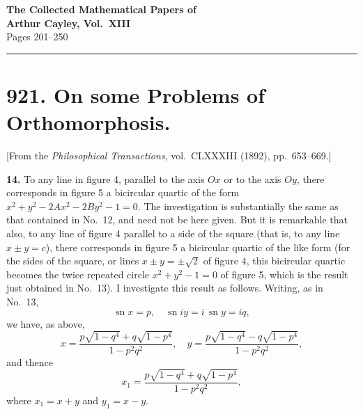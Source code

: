 \documentclass[12pt,a4paper]{article}
\begin{document}
\begin{center}
{\Large\bfseries The Collected Mathematical Papers of\\[4pt]
Arthur Cayley, Vol.~XIII}\\[12pt]
{\large Pages 201--250}\\[8pt]
\rule{\textwidth}{0.4pt}
\end{center}

\tableofcontents
\newpage



\section*{921. On some Problems of Orthomorphosis.}

[From the \textit{Philosophical Transactions}, vol.~CLXXXIII (1892), pp.~653--669.]

\bigskip

\textbf{14.} To any line in figure 4, parallel to the axis $Ox$ or to the axis $Oy$, there
corresponds in figure 5 a bicircular quartic of the form $x^2 + y^2 - 2Ax^2 - 2By^2 - 1 = 0$.
The investigation is substantially the same as that contained in No.~12, and need
not be here given. But it is remarkable that also, to any line of figure 4 parallel
to a side of the square (that is, to any line $x \pm y = c$), there corresponds in figure 5
a bicircular quartic of the like form (for the sides of the square, or lines $x \pm y = \pm \sqrt{2}$
of figure 4, this bicircular quartic becomes the twice repeated circle $x^2 + y^2 - 1 = 0$
of figure 5, which is the result just obtained in No.~13). I investigate this result
as follows. Writing, as in No.~13,
\[
\operatorname{sn} x = p, \quad \operatorname{sn} iy = i\, \operatorname{sn} y = iq,
\]
we have, as above,
\[
x = \frac{p\sqrt{1-q^4} + q\sqrt{1-p^4}}{1-p^2q^2},
\quad
y = \frac{p\sqrt{1-q^4} - q\sqrt{1-p^4}}{1-p^2q^2},
\]
and thence
\[
x_1 = \frac{p\sqrt{1-q^4} + q\sqrt{1-p^4}}{1-p^2q^2},
\]
where $x_1 = x + y$ and $y_1 = x - y$.
\end{document}
